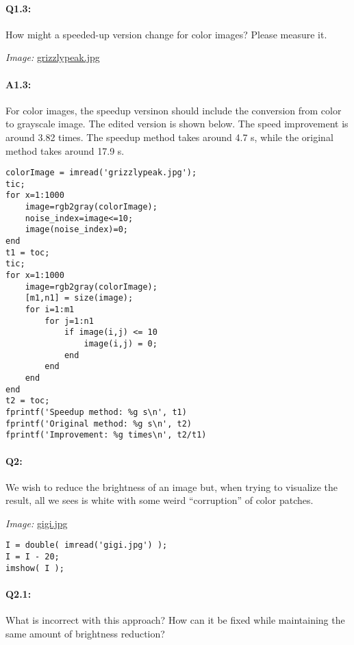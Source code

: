 \documentclass[11pt]{article}
\begin{document}

\pagebreak
\paragraph{Q1.3:} How might a speeded-up version change for color images? Please measure it.

\emph{Image:} \href{grizzlypeak.jpg}{grizzlypeak.jpg}

\paragraph{A1.3:} For color images, the speedup versinon should include the conversion from color to grayscale image. The edited version is shown below. The speed improvement is around 3.82 times. The speedup method takes around 4.7 s, while the original method takes around 17.9 s.
 \begin{lstlisting}[style=Matlab-editor]
colorImage = imread('grizzlypeak.jpg');
tic;
for x=1:1000
    image=rgb2gray(colorImage);
    noise_index=image<=10;
    image(noise_index)=0;
end
t1 = toc;
tic;
for x=1:1000
    image=rgb2gray(colorImage);
    [m1,n1] = size(image);
    for i=1:m1
        for j=1:n1
            if image(i,j) <= 10
                image(i,j) = 0;
            end
        end
    end
end
t2 = toc;
fprintf('Speedup method: %g s\n', t1)
fprintf('Original method: %g s\n', t2)
fprintf('Improvement: %g times\n', t2/t1)
 \end{lstlisting}



\pagebreak
\paragraph{Q2:} We wish to reduce the brightness of an image but, when trying to visualize the result, all we sees is white with some weird ``corruption'' of color patches.

\emph{Image:} \href{gigi.jpg}{gigi.jpg}

\begin{lstlisting}[style=Matlab-editor]
I = double( imread('gigi.jpg') );
I = I - 20;
imshow( I );
\end{lstlisting}

\paragraph{Q2.1:} What is incorrect with this approach? How can it be fixed while maintaining the same amount of brightness reduction?
\end{document}
